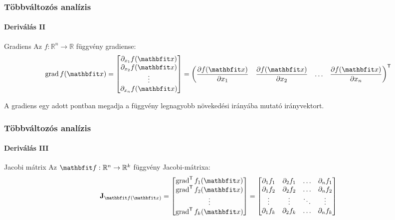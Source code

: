 \begin{frame}
  \frametitle{Többváltozós analízis}
  \framesubtitle{Deriválás II}

  \begin{block}{Gradiens}
    Az $f: \mathbb R^n \rightarrow \mathbb R$ függvény gradiense:
    \def\arraystretch{1.4}
    \newcommand\ds{\displaystyle}
    \[
      \grad f(\rvec x) = \begin{bmatrix}
        \partial_{x_1} f(\rvec x) \\
        \partial_{x_2} f(\rvec x) \\
        \vdots                    \\
        \partial_{x_n} f(\rvec x) \\
      \end{bmatrix} = \begin{pmatrix}
        \ds\pdv{f(\rvec x)}{x_1} &
        \ds\pdv{f(\rvec x)}{x_2} &
        \hdots                   &
        \ds\pdv{f(\rvec x)}{x_n}
      \end{pmatrix}^{\mathsf T}
    \]

    A gradiens egy adott pontban megadja a függvény legnagyobb növekedési
    irányába mutató irányvektort.
  \end{block}
\end{frame}

\begin{frame}
  \frametitle{Többváltozós analízis}
  \framesubtitle{Deriválás III}

  \begin{block}{Jacobi mátrix}
    Az $\rvec f: \mathbb R^n \rightarrow \mathbb R^k$ függvény Jacobi-mátrixa:
    \def\arraystretch{1.4}
    \newcommand\ds{\displaystyle}
    \[
      \rmat J_{\rvec f(\rvec x)}
      =
      \begin{bmatrix}
        \grad^{\mathsf T} f_1(\rvec x) \\
        \grad^{\mathsf T} f_2(\rvec x) \\
        \vdots                         \\
        \grad^{\mathsf T} f_k(\rvec x) \\
      \end{bmatrix}
      =
      \begin{bmatrix}
        \partial_1 f_1 & \partial_2 f_1 & \hdots & \partial_n f_1 \\
        \partial_1 f_2 & \partial_2 f_2 & \hdots & \partial_n f_2 \\
        \vdots         & \vdots         & \ddots & \vdots         \\
        \partial_1 f_k & \partial_2 f_k & \hdots & \partial_n f_k \\
      \end{bmatrix}
    \]
  \end{block}
\end{frame}

